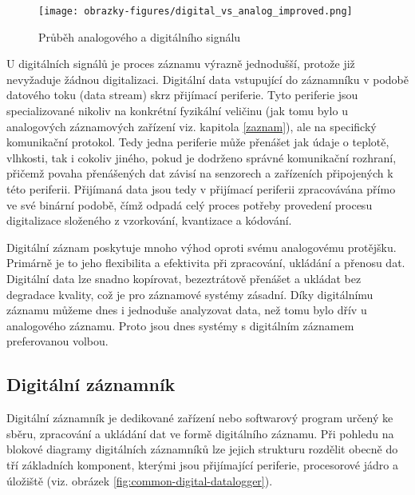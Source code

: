 \begin{figure}[h]
    \centering
    \texttt{[image: obrazky-figures/digital\_vs\_analog\_improved.png]}
    \caption{Průběh analogového a digitálního signálu}
    \label{fig:digital-vs-analog}
\end{figure}

U digitálních signálů je proces záznamu výrazně jednodušší, protože již nevyžaduje žádnou digitalizaci. Digitální data vstupující do záznamníku v podobě datového toku (data stream) skrz přijímací periferie. Tyto periferie jsou specializované nikoliv na konkrétní fyzikální veličinu (jak tomu bylo u analogových záznamových zařízení viz. kapitola \ref{zaznam}), ale na specifický komunikační protokol. Tedy jedna periferie může přenášet jak údaje o teplotě, vlhkosti, tak i cokoliv jiného, pokud je dodrženo správné komunikační rozhraní, přičemž povaha přenášených dat závisí na senzorech a zařízeních připojených k této periferii. Přijímaná data jsou tedy v přijímací periferii zpracovávána přímo ve své binární podobě, čímž odpadá celý proces potřeby provedení procesu digitalizace složeného z vzorkování, kvantizace a kódování. 

\newpage

Digitální záznam poskytuje mnoho výhod oproti svému analogovému protějšku. Primárně je to jeho flexibilita a efektivita při zpracování, ukládání a přenosu dat. Digitální data lze snadno kopírovat, bezeztrátově přenášet a ukládat bez degradace kvality, což je pro záznamové systémy zásadní. Díky digitálnímu záznamu můžeme dnes i jednoduše analyzovat data, než tomu bylo dřív u analogového záznamu. Proto jsou dnes systémy s digitálním záznamem preferovanou volbou.

    
\subsection{Digitální záznamník}
\label{digitalni_zaznamik}
Digitální záznamník je dedikované zařízení nebo softwarový program určený ke sběru, zpracování a ukládání dat ve formě digitálního záznamu. Při pohledu na blokové diagramy digitálních záznamníků lze jejich strukturu rozdělit obecně do tří základních komponent, kterými jsou přijímající periferie, procesorové jádro a úložiště (viz. obrázek \ref{fig:common-digital-datalogger}). \cite{researchgate_general_dataloggger_multiple_sdcards, ieee_digital_sound_recorder_arm_sd_card, ieee_multi_connectivity_datalogger_sd_card}

